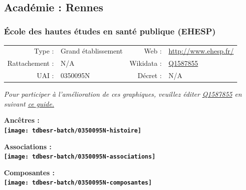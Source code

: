 \documentclass[12pt,french,]{article}
\begin{document}
\ifoddpage ~\newpage \fi   

\hypertarget{acaduxe9mie-rennes-1}{%
\subsection{Académie : Rennes}\label{acaduxe9mie-rennes-1}}

\hypertarget{uxe9cole-des-hautes-uxe9tudes-en-santuxe9-publique-ehesp}{%
\subsubsection{École des hautes études en santé publique
(EHESP)}\label{uxe9cole-des-hautes-uxe9tudes-en-santuxe9-publique-ehesp}}

\begin{tabular*}{\textwidth}{rp{5cm}rl}  
\hline  
Type : & Grand établissement & Web : &\href{http://www.ehesp.fr/}{http://www.ehesp.fr/} \\  
Rattachement : & N/A & Wikidata : & \href{https://www.wikidata.org/entity/Q1587855}{Q1587855} \\  
UAI : & 0350095N & Décret : & N/A \\  
\hline  
\end{tabular*}

\textit{\scriptsize Pour participer à l'amélioration de ces graphiques, veuillez éditer  \href{https://www.wikidata.org/entity/Q1587855}{Q1587855}  en suivant \href{https://github.com/cpesr/wikidataESR/blob/master/Rmd/wikidataESR.md}{ce guide.}}

\vspace{1cm}  
\begin{minipage}[b]{0.50\textwidth}\begin{center} \bf Ancêtres : \\  
\texttt{[image: tdbesr-batch/0350095N-histoire]} \end{center}\end{minipage}\begin{minipage}[b]{0.50\textwidth}\begin{center} \bf Associations : \\  
\texttt{[image: tdbesr-batch/0350095N-associations]} \end{center}\end{minipage}

\hrulefill

\begin{center} \bf Composantes : \\  
\texttt{[image: tdbesr-batch/0350095N-composantes]} \end{center}
\end{document}
